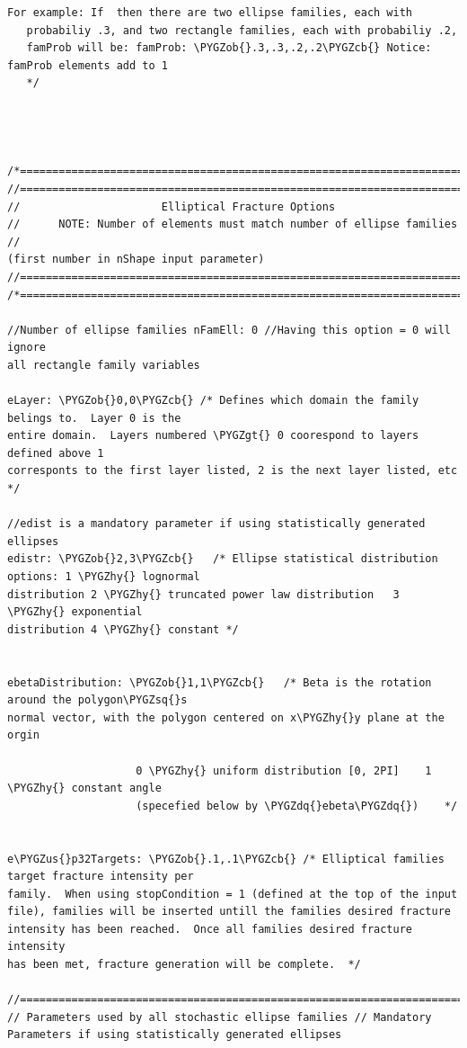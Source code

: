 \documentclass[letterpaper,10pt,english]{sphinxmanual}
\def\PYGZus{\char`\_}
\def\PYGZob{\char`\{}
\def\PYGZcb{\char`\}}
\def\PYGZgt{\char`\>}
\def\PYGZhy{\char`\-}
\def\PYGZsq{\char`\'}
\def\PYGZdq{\char`\"}
\renewcommand\PYGZsq{\textquotesingle}
\begin{document}
\begin{Verbatim}[commandchars=\\\{\}]
   For example: If  then there are two ellipse families, each with
   probabiliy .3, and two rectangle families, each with probabiliy .2,
   famProb will be: famProb: \PYGZob{}.3,.3,.2,.2\PYGZcb{} Notice: famProb elements add to 1
   */




/*===========================================================================*/
//===========================================================================
//                      Elliptical Fracture Options
//      NOTE: Number of elements must match number of ellipse families  //
(first number in nShape input parameter)
//===========================================================================
/*===========================================================================*/

//Number of ellipse families nFamEll: 0 //Having this option = 0 will ignore
all rectangle family variables

eLayer: \PYGZob{}0,0\PYGZcb{} /* Defines which domain the family belings to.  Layer 0 is the
entire domain.  Layers numbered \PYGZgt{} 0 coorespond to layers defined above 1
corresponts to the first layer listed, 2 is the next layer listed, etc */

//edist is a mandatory parameter if using statistically generated ellipses
edistr: \PYGZob{}2,3\PYGZcb{}   /* Ellipse statistical distribution options: 1 \PYGZhy{} lognormal
distribution 2 \PYGZhy{} truncated power law distribution   3 \PYGZhy{} exponential
distribution 4 \PYGZhy{} constant */


ebetaDistribution: \PYGZob{}1,1\PYGZcb{}   /* Beta is the rotation around the polygon\PYGZsq{}s
normal vector, with the polygon centered on x\PYGZhy{}y plane at the orgin

                    0 \PYGZhy{} uniform distribution [0, 2PI]    1 \PYGZhy{} constant angle
                    (specefied below by \PYGZdq{}ebeta\PYGZdq{})    */


e\PYGZus{}p32Targets: \PYGZob{}.1,.1\PYGZcb{} /* Elliptical families target fracture intensity per
family.  When using stopCondition = 1 (defined at the top of the input
file), families will be inserted untill the families desired fracture
intensity has been reached.  Once all families desired fracture intensity
has been met, fracture generation will be complete.  */

//===========================================================================
// Parameters used by all stochastic ellipse families // Mandatory
Parameters if using statistically generated ellipses


\end{Verbatim}
\end{document}
